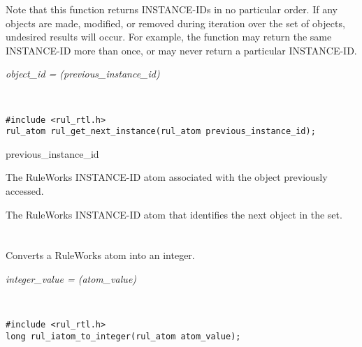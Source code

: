 Note that this function returns INSTANCE-IDs in no particular
order. If any objects are made, modified, or removed during iteration
over the set of objects, undesired results will occur. For example,
the function may return the same INSTANCE-ID more than once, or may
never return a particular INSTANCE-ID.

\Syntax

\it{object\_id} = (\it{previous\_instance\_id})

\begin{args}
   \\
\end{args}

\CBinding
\begin{verbatim}
#include <rul_rtl.h>
rul_atom rul_get_next_instance(rul_atom previous_instance_id);
\end{verbatim}


\begin{argument}
\item[previous\_instance\_id]

  The RuleWorks INSTANCE-ID atom associated with the object previously
  accessed.
\end{argument}

\ReturnValue

The RuleWorks INSTANCE-ID atom that identifies the next object in the
set.

\begin{seealso}
\end{seealso}

\section*{}

Converts a RuleWorks  atom into an integer.

\Syntax

\it{integer\_value} = (\it{atom\_value})

\begin{args}
   \\
\end{args}

\CBinding
\begin{verbatim}
#include <rul_rtl.h>
long rul_iatom_to_integer(rul_atom atom_value);
\end{verbatim}


